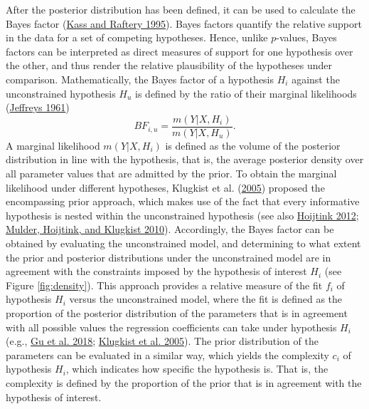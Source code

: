 \documentclass[
  11pt,
]{article}
\begin{document}
After the posterior distribution has been defined, it can be used to calculate the Bayes factor (\protect\hyperlink{ref-kass_raftery_bayes_factors_1995}{Kass and Raftery 1995}).
Bayes factors quantify the relative support in the data for a set of competing hypotheses.
Hence, unlike \(p\)-values, Bayes factors can be interpreted as direct measures of support for one hypothesis over the other, and thus render the relative plausibility of the hypotheses under comparison.
Mathematically, the Bayes factor of a hypothesis \(H_{i}\) against the unconstrained hypothesis \(H_{u}\) is defined by the ratio of their marginal likelihoods (\protect\hyperlink{ref-jeffreys_1961}{Jeffreys 1961})
\[
BF_{i,u} = \frac{m(Y | X, H_{i})}{m(Y|X, H_{u})}.
\]
A marginal likelihood \(m(Y|X, H_i)\) is defined as the volume of the posterior distribution in line with the hypothesis, that is, the average posterior density over all parameter values that are admitted by the prior.
To obtain the marginal likelihood under different hypotheses, Klugkist et al. (\protect\hyperlink{ref-klugkist_inequality_2005}{2005}) proposed the encompassing prior approach, which makes use of the fact that every informative hypothesis is nested within the unconstrained hypothesis (see also \protect\hyperlink{ref-hoijtink_informative_2012}{Hoijtink 2012}; \protect\hyperlink{ref-mulder_equality_2010}{Mulder, Hoijtink, and Klugkist 2010}).
Accordingly, the Bayes factor can be obtained by evaluating the unconstrained model, and determining to what extent the prior and posterior distributions under the unconstrained model are in agreement with the constraints imposed by the hypothesis of interest \(H_i\) (see Figure \ref{fig:density}).
This approach provides a relative measure of the fit \(f_i\) of hypothesis \(H_i\) versus the unconstrained model, where the fit is defined as the proportion of the posterior distribution of the parameters that is in agreement with all possible values the regression coefficients can take under hypothesis \(H_i\) (e.g., \protect\hyperlink{ref-gu_approximated_2018}{Gu et al. 2018}; \protect\hyperlink{ref-klugkist_inequality_2005}{Klugkist et al. 2005}).
The prior distribution of the parameters can be evaluated in a similar way, which yields the complexity \(c_i\) of hypothesis \(H_i\), which indicates how specific the hypothesis is.
That is, the complexity is defined by the proportion of the prior that is in agreement with the hypothesis of interest.

\setlength{\parindent}{0.0in}
\setlength{\leftskip}{0.0in}
\end{document}
